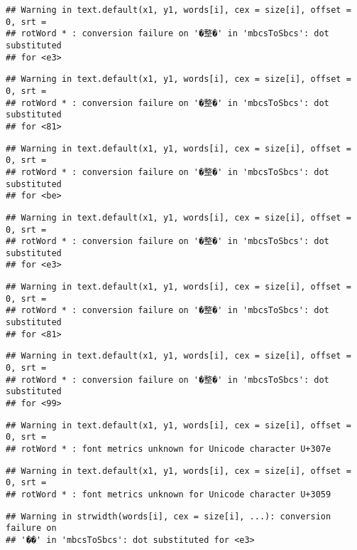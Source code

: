 \documentclass[]{article}
\begin{document}
\begin{verbatim}
## Warning in text.default(x1, y1, words[i], cex = size[i], offset = 0, srt =
## rotWord * : conversion failure on '�整�' in 'mbcsToSbcs': dot substituted
## for <e3>
\end{verbatim}

\begin{verbatim}
## Warning in text.default(x1, y1, words[i], cex = size[i], offset = 0, srt =
## rotWord * : conversion failure on '�整�' in 'mbcsToSbcs': dot substituted
## for <81>
\end{verbatim}

\begin{verbatim}
## Warning in text.default(x1, y1, words[i], cex = size[i], offset = 0, srt =
## rotWord * : conversion failure on '�整�' in 'mbcsToSbcs': dot substituted
## for <be>
\end{verbatim}

\begin{verbatim}
## Warning in text.default(x1, y1, words[i], cex = size[i], offset = 0, srt =
## rotWord * : conversion failure on '�整�' in 'mbcsToSbcs': dot substituted
## for <e3>
\end{verbatim}

\begin{verbatim}
## Warning in text.default(x1, y1, words[i], cex = size[i], offset = 0, srt =
## rotWord * : conversion failure on '�整�' in 'mbcsToSbcs': dot substituted
## for <81>
\end{verbatim}

\begin{verbatim}
## Warning in text.default(x1, y1, words[i], cex = size[i], offset = 0, srt =
## rotWord * : conversion failure on '�整�' in 'mbcsToSbcs': dot substituted
## for <99>
\end{verbatim}

\begin{verbatim}
## Warning in text.default(x1, y1, words[i], cex = size[i], offset = 0, srt =
## rotWord * : font metrics unknown for Unicode character U+307e
\end{verbatim}

\begin{verbatim}
## Warning in text.default(x1, y1, words[i], cex = size[i], offset = 0, srt =
## rotWord * : font metrics unknown for Unicode character U+3059
\end{verbatim}

\begin{verbatim}
## Warning in strwidth(words[i], cex = size[i], ...): conversion failure on
## '��' in 'mbcsToSbcs': dot substituted for <e3>
\end{verbatim}
\end{document}
